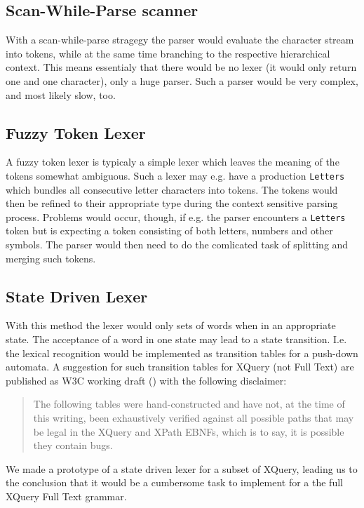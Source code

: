 \subsection{Scan-While-Parse scanner}
\label{sect:ambiguousgrammar:scanWhileParse}
With a scan-while-parse stragegy the parser would evaluate the character stream into tokens, while at the same time branching to the respective hierarchical context. This means essentialy that there would be no lexer (it would only return one and one character), only a huge parser. Such a parser would be very complex, and most likely slow, too.

\subsection{Fuzzy Token Lexer}
A fuzzy token lexer is typicaly a simple lexer which leaves the meaning of the tokens somewhat ambiguous. Such a lexer may e.g. have a production \verb!Letters! which bundles all consecutive letter characters into tokens. The tokens would then be refined to their appropriate type during the context sensitive parsing process. Problems would occur, though, if e.g. the parser encounters a \verb!Letters! token but is expecting a token consisting of both letters, numbers and other symbols. The parser would then need to do the comlicated task of splitting and merging such tokens.

\subsection{State Driven Lexer}
\label{sect:amiguousgrammar:stateDriven}
With this method the lexer would only sets of words when in an appropriate state. The acceptance of a word in one state may lead to a state transition. I.e. the lexical recognition would be implemented as transition tables for a push-down automata. A suggestion for such transition tables for XQuery (not Full Text) are published as W3C working draft (\cite{createTokenizer}) with the following disclaimer:
\begin{quote}
The following tables were hand-constructed and have not, at the time of this writing, been exhaustively verified against all possible paths that may be legal in the XQuery and XPath EBNFs, which is to say, it is possible they contain bugs.
\end{quote}
We made a prototype of a state driven lexer for a subset of XQuery, leading us to the conclusion that it would be a cumbersome task to implement for a the full XQuery Full Text grammar.


